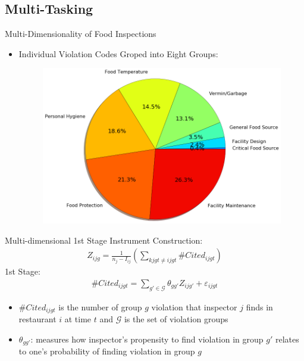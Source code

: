 \documentclass{beamer}
\begin{document}
\subsection{Multi-Tasking}
\begin{frame}{Multi-Dimensionality of Food Inspections}
    \begin{itemize}
    \item Individual Violation Codes Groped into Eight Groups: 
    \begin{figure}
        \centering
        \includegraphics[scale = 0.3]{viol_group_pie.png}
    \end{figure}
    \end{itemize}
\end{frame}

\begin{frame}{Multi-dimensional 1st Stage}
    Instrument Construction:
    \begin{align*}
        Z_{ijg} = \frac{1}{n_j - I_{ij}} \left(\sum_{kjgt \neq ijgt} \# Cited_{ijgt}\right)
    \end{align*}
    \pause
    1st Stage:
    \begin{align*}
        \# Cited_{ijgt} = \sum_{g'\in \mathcal{G}} \theta_{gg'}Z_{ijg'} + \varepsilon_{ijgt} 
    \end{align*}
    \begin{itemize}
    \item $\# Cited_{ijgt}$ is the number of group $g$ violation that inspector $j$ finds in restaurant $i$ at time $t$ and $\mathcal{G}$ is the set of violation groups
    \item $\theta_{gg'}$: measures how inspector's propensity to find violation in group $g'$ relates to one's probability of finding violation in group $g$ 
    \end{itemize}
\end{frame}
\end{document}
